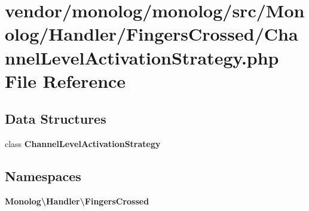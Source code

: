 \section{vendor/monolog/monolog/src/\+Monolog/\+Handler/\+Fingers\+Crossed/\+Channel\+Level\+Activation\+Strategy.php File Reference}
\label{_channel_level_activation_strategy_8php}
\subsection*{Data Structures}
\begin{DoxyCompactItemize}
\item 
class {\bf Channel\+Level\+Activation\+Strategy}
\end{DoxyCompactItemize}
\subsection*{Namespaces}
\begin{DoxyCompactItemize}
\item 
 {\bf Monolog\textbackslash{}\+Handler\textbackslash{}\+Fingers\+Crossed}
\end{DoxyCompactItemize}
